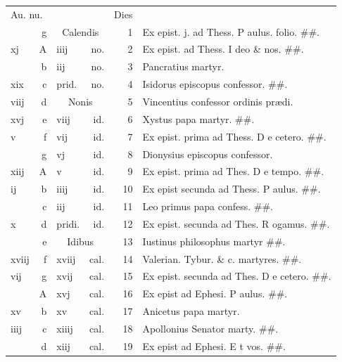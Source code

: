 \documentclass[a5paper,10pt]{book}
\def\ae{æ}
\begin{document}
\begin{center}
\begin{tabular}{l r l r r l}
\multicolumn{2}{l}{\color{red}Au. nu.} & & & \color{red} Dies & \\
 & g & \multicolumn{2}{c}{\color{red} Calendis} & 1 & Ex epist. j. ad Thess. \color{red} P\color{black} aulus. folio. \#\#.\\%
xj & \color{red} A & iiij & no. & 2 & Ex epist. ad Thess. \color{red} I\color{black} deo \& nos. \#\#.\\%
 & b & iij & no. & 3 & Pancratius martyr. \color{black} \\
xix & c & \color{red} prid. & no. & 4 & Isidorus episcopus confessor. \color{black} \#\#.\\
viij & d & \multicolumn{2}{c}{\color{red} Nonis} & 5 & Vincentius confessor ordinis pr\ae di. \color{black} \\
xvj & e & viij & id. & 6 & Xystus papa martyr. \color{black} \#\#.\\
v & f & vij & id. & 7 & Ex epist. prima ad Thess. \color{red} D\color{black} e cetero. \#\#.\\
 & g & vj & id. & 8 & Dionysius episcopus confessor. \color{black} \\
xiij & \color{red} A & v & id. & 9 & Ex epist. prima ad Thes. \color{red} D\color{black} e tempo. \#\#.\\
ij & b & iiij & id. & 10 & Ex epist secunda ad Thess. \color{red} P\color{black} aulus. \#\#.\\
 & c & iij & id. & 11 & Leo primus papa confess. \color{black} \#\#.\\
x & d & \color{red} pridi. & id. & 12 & Ex epist. secunda ad Thes. \color{red} R\color{black} ogamus. \#\#.\\
 & e & \multicolumn{2}{c}{\color{red} Idibus} & 13 & Iustinus philosophus martyr \#\#.\\
xviij & f & xviij & cal. & 14 & Valerian. Tybur. \& c. martyres. \#\#.\\
vij & g & xvij & cal. & 15 & Ex epist. secunda ad Thes. \color{red} D\color{black} e cetero. \#\#.\\
 & \color{red} A & xvj & cal. & 16 & Ex epist ad Ephesi. \color{red} P\color{black} aulus. \#\#.\\
xv & b & xv & cal. & 17 & Anicetus papa martyr. \\
iiij & c & xiiij & cal. & 18 & Apollonius Senator marty. \#\#.\\
 & d & xiij & cal. & 19 & Ex epist ad Ephesi. \color{red} E\color{black} t vos. \#\#.\\

\end{tabular}
\end{center}
\end{document}
